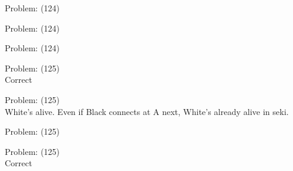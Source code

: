 \documentclass[11pt]{article}
\begin{document}
\begin{minipage}[t]{0.5\textwidth}
  {\centering
  
  Problem: (124)\\
  
  }
\end{minipage}
\begin{minipage}[t]{0.5\textwidth}
  {\centering
  
  Problem: (124)\\
  
  }
\end{minipage}
\begin{minipage}[t]{0.5\textwidth}
  {\centering
  
  Problem: (124)\\
  
  }
\end{minipage}
\begin{minipage}[t]{0.5\textwidth}
  {\centering
  
  Problem: (125)\\
  Correct\\
  }
\end{minipage}
\begin{minipage}[t]{0.5\textwidth}
  {\centering
  
  Problem: (125)\\
  White's alive. Even if Black connects at A next, White's already alive in seki.\\
  }
\end{minipage}
\begin{minipage}[t]{0.5\textwidth}
  {\centering
  
  Problem: (125)\\
  
  }
\end{minipage}
\begin{minipage}[t]{0.5\textwidth}
  {\centering
  
  Problem: (125)\\
  Correct\\
  }
\end{minipage}
\end{document}
